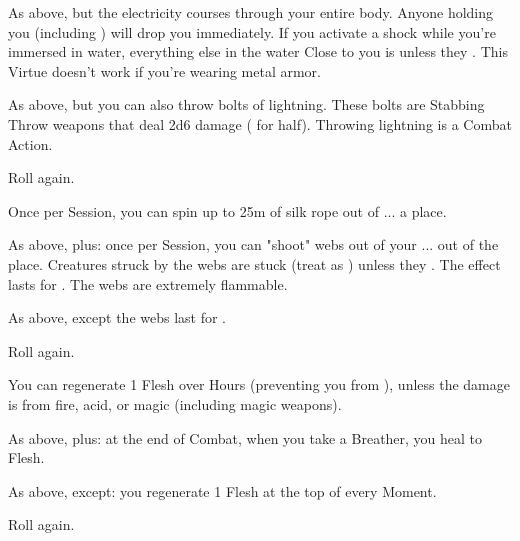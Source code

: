 \begin{multicols*}{2}
 As above, but the electricity courses through your entire body. Anyone holding you (including ) will drop you immediately.  If you activate a shock while you're immersed in water, everything else in the water Close to you is  unless they . This Virtue doesn't work if you're wearing metal armor.

 As above, but you can also throw bolts of lightning. These bolts are Stabbing \FOC Throw weapons that deal 2d6 damage ( for half). Throwing lightning is a Combat Action.

 Roll again.


\NC[Name=Spin Silk]

 Once per Session, you can spin up to 25m of silk rope out of ... a place.

 As above, plus: once per Session, you can "shoot" webs out of your ... out of the place.  Creatures struck by the webs are stuck (treat as ) unless they .  The effect lasts for .  The webs are extremely flammable.

 As above, except the webs last for .

 Roll again.

\NC[Name=Troll Blood]

 You can regenerate 1 Flesh over Hours (preventing you from ), unless the damage is from fire, acid, or magic (including magic weapons).

 As above, plus:  at the end of Combat, when you take a Breather, you heal to \MAX Flesh.

 As above, except: you regenerate 1 Flesh at the top of every Moment.

 Roll again.

\newpage

\end{multicols*}
\begin{center}
\end{center}
